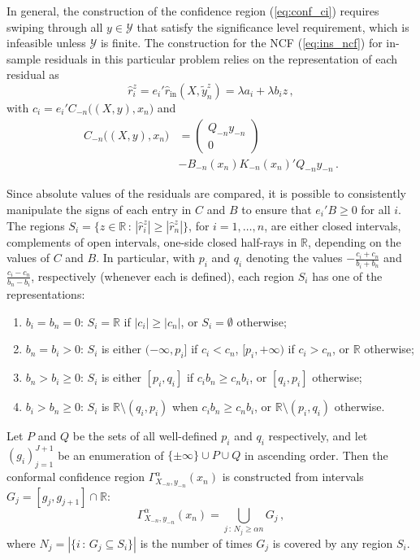 \documentclass{ITaSconf}
\newcommand{\Ycal}{\mathcal{Y}}
\newcommand{\Real}{\mathbb{R}}
\begin{document}
In general, the construction of the confidence region (\ref{eq:conf_ci}) requires
swiping through all $y\in \Ycal$ that satisfy the significance level requirement,
which is infeasible unless $\Ycal$ is finite. The construction for the NCF (\ref{eq:ins_ncf})
for in-sample residuals in this particular problem relies on the representation
of each residual as
\begin{equation*}
  \hat{r}_i^z
    = e_i' \hat{r}_{\text{in}}(X, \tilde{y}_n^z)
    = \lambda a_i + \lambda b_i z
    \,,
\end{equation*}
with $c_i = e_i' C_{-n}\bigl((X, y), x_n\bigr)$ and
\begin{align*}
  C_{-n}\bigl((X, y), x_n\bigr)
    &= \begin{pmatrix} Q_{-n} y_{-n} \\ 0 \end{pmatrix} \\
    &- B_{-n}(x_n) K_{-n}(x_n)' Q_{-n} y_{-n}
    \,.
\end{align*}

Since absolute values of the residuals are compared, it is possible to consistently
manipulate the signs of each entry in $C$ and $B$ to ensure that $e_i'B\geq 0$ for
all $i$. The regions $S_i = \{z\in\Real\,:\, |\hat{r}_i^z| \geq |\hat{r}_n^z|\}$, for
$i=1,\ldots, n$, are either closed intervals, complements of open intervals,
one-side closed half-rays in $\Real$, depending on the values of $C$ and $B$. In
particular, with $p_i$ and $q_i$ denoting the values $-\frac{c_i+c_n}{b_i+b_n}$ and
$\frac{c_i-c_n}{b_n-b_i}$, respectively (whenever each is defined), each region
$S_i$ has one of the representations:
\begin{enumerate}
  \item $b_i=b_n=0$: $S_i = \Real$ if $|c_i| \geq |c_n|$, or $S_i = \emptyset$
  otherwise;
  \item $b_n = b_i > 0$: $S_i$ is either $(-\infty, p_i]$ if $c_i < c_n$, $[p_i, +\infty)$ if
  $c_i > c_n$, or $\Real$ otherwise;
  \item $b_n > b_i \geq 0$: $S_i$ is either $[p_i, q_i]$ if $c_i b_n \geq c_n b_i$,
  or $[q_i, p_i]$ otherwise;
  \item $b_i > b_n \geq 0$: $S_i$ is $\Real\setminus (q_i, p_i)$ when $c_i b_n \geq c_n b_i$,
  or $\Real\setminus (p_i, q_i)$ otherwise.
\end{enumerate}
Let $P$ and $Q$ be the sets of all well-defined $p_i$ and $q_i$ respectively, and let
$(g_i)_{j=1}^{J+1}$ be an enumeration of $\{\pm\infty\}\cup P \cup Q$ in ascending
order. Then the conformal confidence region $\Gamma_{X_{-n}, y_{-n}}^\alpha(x_n)$ is
constructed from intervals $G_j = [g_j, g_{j+1}] \cap \Real$:
\begin{equation*}\label{eq:rrcm_conf_ci}
  \Gamma_{X_{-n}, y_{-n}}^\alpha(x_n)
    = \bigcup_{j\,:\, N_j \geq \alpha n} G_j
    \,,
\end{equation*}
where $N_j = |\{i\,:\,G_j \subseteq S_i\}|$ is the number of times $G_j$ is covered by
any region $S_i$.
\end{document}
